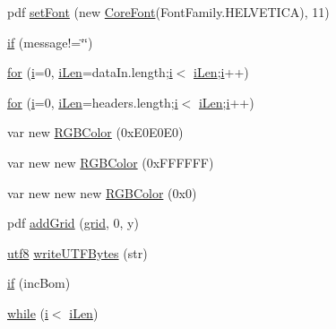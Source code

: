 \begin{DoxyCompactItemize}
\item 
pdf \hyperlink{class_zero_clipboard_abc93d5ac4a0a0e04becbf9657383104b}{set\+Font} (new \hyperlink{_zero_clipboard_pdf_8as_a183616598243889d6077ab7f545062f7}{Core\+Font}(Font\+Family.\+H\+E\+L\+V\+E\+T\+I\+C\+A), 11)
\item 
\hyperlink{class_zero_clipboard_a737bd71e3b04ae4ecd5735731d0fc257}{if} (message!=\char`\"{}\char`\"{})
\item 
\hyperlink{class_zero_clipboard_aff248037094eb8e38eebffa2e5705e56}{for} (\hyperlink{class_zero_clipboard_a6223f7d5fbe005d68fc2491950a20f87}{i}=0, \hyperlink{class_zero_clipboard_a249befb1af7eb431a5ce5b63344df54d}{i\+Len}=data\+In.\+length;\hyperlink{class_zero_clipboard_a6223f7d5fbe005d68fc2491950a20f87}{i}$<$ \hyperlink{class_zero_clipboard_a249befb1af7eb431a5ce5b63344df54d}{i\+Len};\hyperlink{class_zero_clipboard_a6223f7d5fbe005d68fc2491950a20f87}{i}++)
\item 
\hyperlink{class_zero_clipboard_a6296e6b54b198cf3198c7d68658dddcb}{for} (\hyperlink{class_zero_clipboard_a6223f7d5fbe005d68fc2491950a20f87}{i}=0, \hyperlink{class_zero_clipboard_a249befb1af7eb431a5ce5b63344df54d}{i\+Len}=headers.\+length;\hyperlink{class_zero_clipboard_a6223f7d5fbe005d68fc2491950a20f87}{i}$<$ \hyperlink{class_zero_clipboard_a249befb1af7eb431a5ce5b63344df54d}{i\+Len};\hyperlink{class_zero_clipboard_a6223f7d5fbe005d68fc2491950a20f87}{i}++)
\item 
var new \hyperlink{class_zero_clipboard_a08b586506c710efb4a2b5e74019a9808}{R\+G\+B\+Color} (0x\+E0\+E0\+E0)
\item 
var new new \hyperlink{class_zero_clipboard_a1b046ac1ceec848cf99ade91b585360d}{R\+G\+B\+Color} (0x\+F\+F\+F\+F\+F\+F)
\item 
var new new new \hyperlink{class_zero_clipboard_aca118e4608525a7676da0be06b017cb7}{R\+G\+B\+Color} (0x0)
\item 
pdf \hyperlink{class_zero_clipboard_adcaafc9acdbe38b627588abdde117268}{add\+Grid} (\hyperlink{class_zero_clipboard_a8a5fe1f6b72c77c227e3fae9547afcb2}{grid}, 0, y)
\item 
\hyperlink{class_zero_clipboard_aac6800a9ea2987f07e6cd7d3fb33dcc4}{utf8} \hyperlink{class_zero_clipboard_ab12bda244f25d23412ef1d873649fbce}{write\+U\+T\+F\+Bytes} (str)
\item 
\hyperlink{class_zero_clipboard_acac7dc45f4c0a0adb35a221040334dc3}{if} (inc\+Bom)
\item 
\hyperlink{class_zero_clipboard_a6eb9073c4b930c1aae5ec20a6646f24d}{while} (\hyperlink{class_zero_clipboard_a6223f7d5fbe005d68fc2491950a20f87}{i}$<$ \hyperlink{class_zero_clipboard_a249befb1af7eb431a5ce5b63344df54d}{i\+Len})
\end{DoxyCompactItemize}
